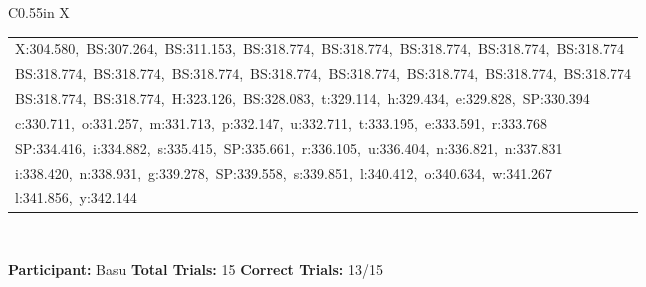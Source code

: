 \documentclass[10pt,a4paper]{article}
\begin{document}
\begin{center}
\begin{tabularx}{\textwidth}{
    C{0.55in}
    X
}
\begin{tabular}[t]{@{}l@{}}
X:304.580,\ BS:307.264,\ BS:311.153,\ BS:318.774,\ BS:318.774,\ BS:318.774,\ BS:318.774,\ BS:318.774\\
BS:318.774,\ BS:318.774,\ BS:318.774,\ BS:318.774,\ BS:318.774,\ BS:318.774,\ BS:318.774,\ BS:318.774\\
BS:318.774,\ BS:318.774,\ H:323.126,\ BS:328.083,\ t:329.114,\ h:329.434,\ e:329.828,\ SP:330.394\\
c:330.711,\ o:331.257,\ m:331.713,\ p:332.147,\ u:332.711,\ t:333.195,\ e:333.591,\ r:333.768\\
SP:334.416,\ i:334.882,\ s:335.415,\ SP:335.661,\ r:336.105,\ u:336.404,\ n:336.821,\ n:337.831\\
i:338.420,\ n:338.931,\ g:339.278,\ SP:339.558,\ s:339.851,\ l:340.412,\ o:340.634,\ w:341.267\\
l:341.856,\ y:342.144
\end{tabular}
\\[0.12cm]

\bottomrule
\end{tabularx}
\end{center}

\vfill


\noindent
\textbf{Participant:} Basu
\hfill
\textbf{Total Trials:} 15
\hfill
\textbf{Correct Trials:} 13/15
\end{document}
